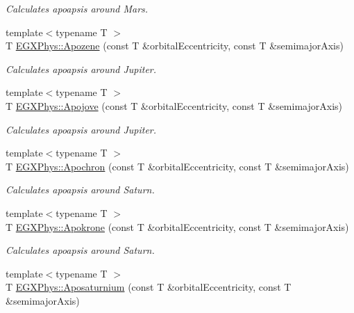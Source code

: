 \begin{DoxyCompactItemize}
\begin{DoxyCompactList}\small\item\em Calculates apoapsis around Mars. \end{DoxyCompactList}\item 
{\footnotesize template$<$typename T $>$ }\\T \mbox{\hyperlink{group___e_g_x_phys-_apoapsis_ga44d3dd8d8b350d053b25b7b1f1e15534}{E\+G\+X\+Phys\+::\+Apozene}} (const T \&orbital\+Eccentricity, const T \&semimajor\+Axis)
\begin{DoxyCompactList}\small\item\em Calculates apoapsis around Jupiter. \end{DoxyCompactList}\item 
{\footnotesize template$<$typename T $>$ }\\T \mbox{\hyperlink{group___e_g_x_phys-_apoapsis_ga5a45d0a873514113aaa0adc95aefbbde}{E\+G\+X\+Phys\+::\+Apojove}} (const T \&orbital\+Eccentricity, const T \&semimajor\+Axis)
\begin{DoxyCompactList}\small\item\em Calculates apoapsis around Jupiter. \end{DoxyCompactList}\item 
{\footnotesize template$<$typename T $>$ }\\T \mbox{\hyperlink{group___e_g_x_phys-_apoapsis_gae4ea146039e6f32022321f0998e715e8}{E\+G\+X\+Phys\+::\+Apochron}} (const T \&orbital\+Eccentricity, const T \&semimajor\+Axis)
\begin{DoxyCompactList}\small\item\em Calculates apoapsis around Saturn. \end{DoxyCompactList}\item 
{\footnotesize template$<$typename T $>$ }\\T \mbox{\hyperlink{group___e_g_x_phys-_apoapsis_ga98557a8d49aa129c29e652c4758334d1}{E\+G\+X\+Phys\+::\+Apokrone}} (const T \&orbital\+Eccentricity, const T \&semimajor\+Axis)
\begin{DoxyCompactList}\small\item\em Calculates apoapsis around Saturn. \end{DoxyCompactList}\item 
{\footnotesize template$<$typename T $>$ }\\T \mbox{\hyperlink{group___e_g_x_phys-_apoapsis_gac157adc20a88c8616e4822eb819f9016}{E\+G\+X\+Phys\+::\+Aposaturnium}} (const T \&orbital\+Eccentricity, const T \&semimajor\+Axis)

\end{DoxyCompactItemize}
